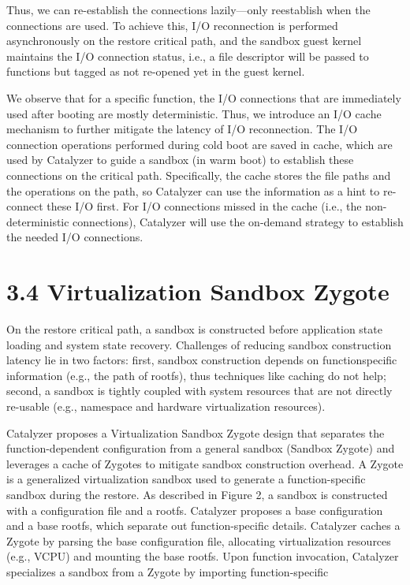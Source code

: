 \documentclass[
  10
]{article}
\begin{document}
Thus, we can re-establish the connections lazily---only reestablish when
the connections are used. To achieve this, I/O reconnection is performed
asynchronously on the restore critical path, and the sandbox guest
kernel maintains the I/O connection status, i.e., a file descriptor will
be passed to functions but tagged as not re-opened yet in the guest
kernel.

We observe that for a specific function, the I/O connections that are
immediately used after booting are mostly deterministic. Thus, we
introduce an I/O cache mechanism to further mitigate the latency of I/O
reconnection. The I/O connection operations performed during cold boot
are saved in cache, which are used by Catalyzer to guide a sandbox (in
warm boot) to establish these connections on the critical path.
Specifically, the cache stores the file paths and the operations on the
path, so Catalyzer can use the information as a hint to re-connect these
I/O first. For I/O connections missed in the cache (i.e., the
non-deterministic connections), Catalyzer will use the on-demand
strategy to establish the needed I/O connections.

\section{3.4 Virtualization Sandbox
Zygote}\label{virtualization-sandbox-zygote}

On the restore critical path, a sandbox is constructed before
application state loading and system state recovery. Challenges of
reducing sandbox construction latency lie in two factors: first, sandbox
construction depends on functionspecific information (e.g., the path of
rootfs), thus techniques like caching do not help; second, a sandbox is
tightly coupled with system resources that are not directly re-usable
(e.g., namespace and hardware virtualization resources).

Catalyzer proposes a Virtualization Sandbox Zygote design that separates
the function-dependent configuration from a general sandbox (Sandbox
Zygote) and leverages a cache of Zygotes to mitigate sandbox
construction overhead. A Zygote is a generalized virtualization sandbox
used to generate a function-specific sandbox during the restore. As
described in Figure 2, a sandbox is constructed with a configuration
file and a rootfs. Catalyzer proposes a base configuration and a base
rootfs, which separate out function-specific details. Catalyzer caches a
Zygote by parsing the base configuration file, allocating virtualization
resources (e.g., VCPU) and mounting the base rootfs. Upon function
invocation, Catalyzer specializes a sandbox from a Zygote by importing
function-specific
\end{document}
